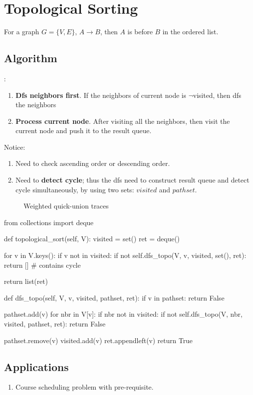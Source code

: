\section{Topological Sorting}
For a graph $G=\{V, E\}$, $ A \rightarrow B $, then $A$ is before $B$ in the ordered list. 
\subsection{Algorithm}
:
\begin{enumerate}
\item \textbf{Dfs neighbors first}. If the neighbors of current node is  $\neg$visited, then dfs the neighbors
\item \textbf{Process current node}. After visiting all the neighbors, then visit the current node and push it to the result queue.

\end{enumerate}
Notice:
\begin{enumerate}
\item Need to check ascending order or descending order. 
\item Need to \textbf{detect cycle}; thus the dfs need to construct result queue and detect cycle simultaneously, by using two sets: $visited$ and $pathset$. 
\end{enumerate}
\begin{figure}[hbtp]
\centering
\subfloat{\texttt{[image: uf]}}
\caption{Weighted quick-union traces}
\label{fig:union_find}
\end{figure}
\begin{python}
from collections import deque

def topological_sort(self, V):
  visited = set()
  ret = deque()

  for v in V.keys():
    if v not in visited:
      if not self.dfs_topo(V, v, visited, set(), ret):
        return []  # contains cycle 

  return list(ret)

def dfs_topo(self, V, v, visited, pathset, ret):
  if v in pathset:
    return False

  pathset.add(v)
  for nbr in V[v]:
    if nbr not in visited:
      if not self.dfs_topo(V, nbr, visited, pathset, ret):
        return False

  pathset.remove(v)
  visited.add(v)
  ret.appendleft(v)
  return True

\end{python}

\subsection{Applications}
\begin{enumerate}
\item Course scheduling problem with pre-requisite. 
\end{enumerate}


